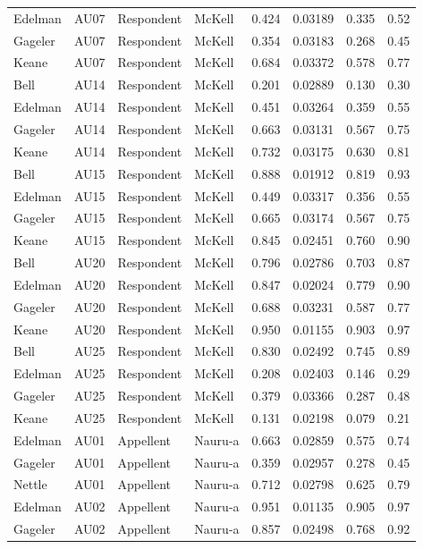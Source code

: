 \documentclass{monashthesis}
\begin{document}
\begin{center}
\begin{longtable}{llllllll}
Edelman & AU07 & Respondent & McKell & 0.424 & 0.03189 & 0.335 & 0.52 \\
Gageler & AU07 & Respondent & McKell & 0.354 & 0.03183 & 0.268 & 0.45 \\
Keane & AU07 & Respondent & McKell & 0.684 & 0.03372 & 0.578 & 0.77 \\
Bell & AU14 & Respondent & McKell & 0.201 & 0.02889 & 0.130 & 0.30 \\
Edelman & AU14 & Respondent & McKell & 0.451 & 0.03264 & 0.359 & 0.55 \\
Gageler & AU14 & Respondent & McKell & 0.663 & 0.03131 & 0.567 & 0.75 \\
Keane & AU14 & Respondent & McKell & 0.732 & 0.03175 & 0.630 & 0.81 \\
Bell & AU15 & Respondent & McKell & 0.888 & 0.01912 & 0.819 & 0.93 \\
Edelman & AU15 & Respondent & McKell & 0.449 & 0.03317 & 0.356 & 0.55 \\
Gageler & AU15 & Respondent & McKell & 0.665 & 0.03174 & 0.567 & 0.75 \\
Keane & AU15 & Respondent & McKell & 0.845 & 0.02451 & 0.760 & 0.90 \\
Bell & AU20 & Respondent & McKell & 0.796 & 0.02786 & 0.703 & 0.87 \\
Edelman & AU20 & Respondent & McKell & 0.847 & 0.02024 & 0.779 & 0.90 \\
Gageler & AU20 & Respondent & McKell & 0.688 & 0.03231 & 0.587 & 0.77 \\
Keane & AU20 & Respondent & McKell & 0.950 & 0.01155 & 0.903 & 0.97 \\
Bell & AU25 & Respondent & McKell & 0.830 & 0.02492 & 0.745 & 0.89 \\
Edelman & AU25 & Respondent & McKell & 0.208 & 0.02403 & 0.146 & 0.29 \\
Gageler & AU25 & Respondent & McKell & 0.379 & 0.03366 & 0.287 & 0.48 \\
Keane & AU25 & Respondent & McKell & 0.131 & 0.02198 & 0.079 & 0.21 \\
Edelman & AU01 & Appellent & Nauru-a & 0.663 & 0.02859 & 0.575 & 0.74 \\
Gageler & AU01 & Appellent & Nauru-a & 0.359 & 0.02957 & 0.278 & 0.45 \\
Nettle & AU01 & Appellent & Nauru-a & 0.712 & 0.02798 & 0.625 & 0.79 \\
Edelman & AU02 & Appellent & Nauru-a & 0.951 & 0.01135 & 0.905 & 0.97 \\
Gageler & AU02 & Appellent & Nauru-a & 0.857 & 0.02498 & 0.768 & 0.92 \\

\end{longtable}
\end{center}
\end{document}
